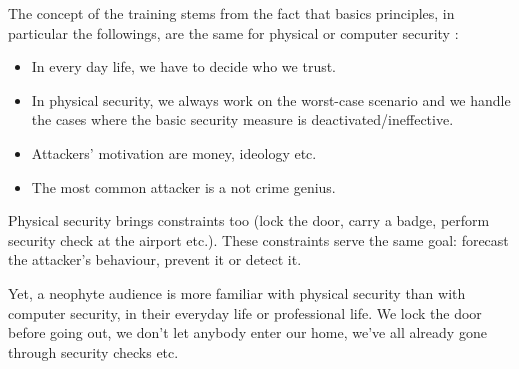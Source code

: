 \documentclass[11pt]{article} %
\begin{document}
The concept of the training stems from the fact that
basics principles, in particular the followings,
 are the same for physical or computer security :
\begin{itemize}
\item In every day life, we have to decide who we trust.
\item In physical security, we always work on the worst-case scenario and we 
handle the cases where the basic security measure is deactivated/ineffective. 
\item Attackers' motivation are money, ideology etc. 
\item The most common attacker is a not crime genius.
\end{itemize}
%
%

Physical security brings constraints too (lock the door, 
carry a badge, perform security check at the airport etc.). 
These constraints serve the same goal: forecast the attacker's behaviour, 
prevent it or detect it.

Yet, a neophyte audience is more familiar with physical security 
than with computer security, in their everyday life or professional life. We 
lock the door before going out, we don't let anybody enter 
our home, we've all already gone through security checks etc.
\end{document}

